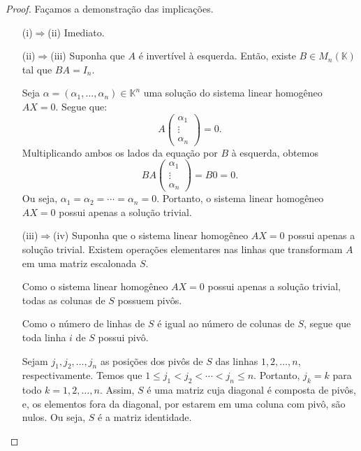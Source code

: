 \begin{proof} Façamos a demonstração das implicações.
    \begin{itemize}
        \item[(i)$\Rightarrow$(ii)] Imediato.

        \item[(ii)$\Rightarrow$(iii)] Suponha que $A$ é invertível à esquerda.
            Então, existe $B\in M_{n}(\mathbb K)$ tal que $BA=I_n$.

            Seja $\alpha=(\alpha_1, \dots, \alpha_n)\in \mathbb K^n$ uma solução do sistema linear homogêneo $AX=0$.
            Segue que:
            \begin{equation*}
                A\begin{pmatrix} \alpha_1 \\ \vdots \\ \alpha_n \end{pmatrix} = 0.
            \end{equation*}
            Multiplicando ambos os lados da equação por $B$ à esquerda, obtemos \begin{equation*}
                BA\begin{pmatrix} \alpha_1 \\ \vdots \\ \alpha_n \end{pmatrix} = B0=0.
            \end{equation*}
            Ou seja, $\alpha_1=\alpha_2=\cdots=\alpha_n=0$.
            Portanto, o sistema linear homogêneo $AX=0$ possui apenas a solução trivial.

        \item[(iii)$\Rightarrow$(iv)] Suponha que o sistema linear homogêneo $AX=0$ possui apenas a solução trivial.
        Existem operações elementares nas linhas que transformam $A$ em uma matriz escalonada $S$.

        Como o sistema linear homogêneo $AX=0$ possui apenas a solução trivial, todas as colunas de $S$ possuem pivôs.
        
        Como o número de linhas de $S$ é igual ao número de colunas de $S$, segue que toda linha $i$ de $S$ possui pivô.

        Sejam $j_1, j_2, \dots, j_n$ as posições dos pivôs de $S$ das linhas $1, 2, \dots, n$, respectivamente.
        Temos que $1\leq j_1 < j_2 < \cdots < j_n \leq n$.
        Portanto, $j_k=k$ para todo $k=1, 2, \dots, n$.
        Assim, $S$ é uma matriz cuja diagonal é composta de pivôs, e, os elementos fora da diagonal, por estarem em uma coluna com pivô, são nulos.
        Ou seja, $S$ é a matriz identidade.


\end{itemize}
\end{proof}
